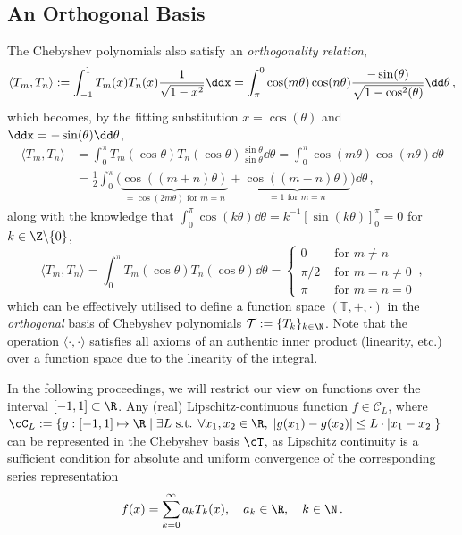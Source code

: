 \documentclass[12pt, a4paper]{article}
\newcommand{\chebyshev}{Chebyshev\xspace}
\begin{document}
  \subsection{An Orthogonal Basis}
  The \chebyshev polynomials also satisfy an \emph{orthogonality relation},
  $$\langle T_m, T_n \rangle := \int_{-1}^1 T_m(x) T_n(x) \frac{1}{\sqrt{1-x^2}} \ddx = \int_{\pi}^{0} \cos(m \theta) \cos(n \theta) \frac{-\sin(\theta)}{\sqrt{1-\cos^2(\theta)}} \dd\theta \,,$$
  which becomes, by the fitting substitution $x = \cos(\theta)$ and $\ddx = -\sin(\theta) \dd\theta$,
  \begin{align*}
    \langle T_m, T_n \rangle & = \int_0^\pi T_m(\cos \theta) T_n(\cos \theta) \frac{\sin \theta}{\sin \theta}\dd\theta = \int_0^\pi \cos(m \theta) \cos(n \theta) \dd\theta                               \\
                             & = \frac{1}{2} \int_0^\pi \big(\underbrace{\cos((m+n) \theta)}_{=\cos(2m\theta) \text{ for } m=n} + \underbrace{\cos((m-n) \theta)}_{=1 \text{ for } m=n}\big) \dd\theta\,,
  \end{align*}
  along with the knowledge that $\int_0^\pi \cos(k \theta) \dd\theta = k^{-1} \left[\sin(k\theta)\right]_0^\pi = 0$ for $k \in \Z \backslash \{0\}$,
  $$\langle T_m, T_n \rangle = \int_0^\pi T_m(\cos \theta) T_n(\cos \theta) \dd\theta = \begin{cases}
      0     & \text{ for } m \neq n     \\
      \pi/2 & \text{ for } m = n \neq 0 \\
      \pi   & \text{ for } m = n = 0
    \end{cases}\,,$$
  which can be effectively utilised to define a function space $(\mathbb{T}, +, \cdot)$ in the \emph{orthogonal} basis of \chebyshev polynomials $\mathcal{T} := \{T_k\}_{k \in \N}$.
  Note that the operation $\langle \cdot, \cdot \rangle$ satisfies all axioms of an authentic inner product (linearity, etc.) over a function space due to the linearity of the integral.

  In the following proceedings, we will restrict our view on functions over the interval $[-1, 1] \subset \R$.
  Any (real) Lipschitz-continuous function $f \in \mathcal{C}_L$, where $\cC_L := \{g: [-1, 1] \mapsto \R \;|\; \exists L \text{ s.t. } \forall x_1, x_2 \in \R, \; |g(x_1) - g(x_2)| \le L \cdot |x_1-x_2|\}$ can be represented in the \chebyshev basis $\cT$, as Lipschitz continuity is a sufficient condition for absolute and uniform convergence of the corresponding series representation \parencite{atap}
  $$f(x) = \sum_{k=0}^\infty a_k T_k(x), \quad a_k \in \R,\quad k \in \N \,.$$
\end{document}

